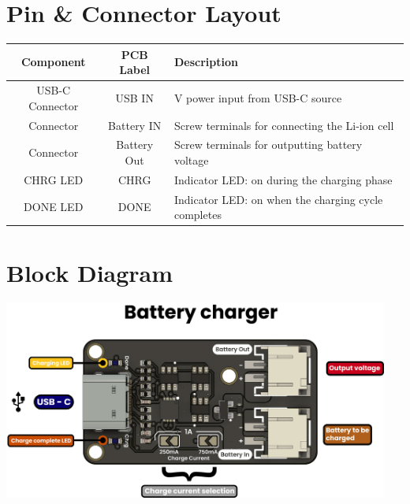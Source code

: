 \documentclass[10pt]{article}
\begin{document}
\section*{Pin \& Connector Layout}
\begin{tabularx}{\textwidth}{|c|c|>{\RaggedRight\arraybackslash}X|}
\hline
\rowcolor{headergray}
Component & PCB Label & Description \\
\hline
USB-C Connector & USB IN & 5 V power input from USB-C source \\
Connector & Battery IN & Screw terminals for connecting the Li-ion cell \\
Connector & Battery Out & Screw terminals for outputting battery voltage \\
CHRG LED & CHRG & Indicator LED: on during the charging phase \\
DONE LED & DONE & Indicator LED: on when the charging cycle completes \\
\hline
\end{tabularx}


\FloatBarrier
\newpage
\vspace*{3em}
\section*{Block Diagram}
\vspace{1em}
\begin{center}
\includegraphics[width=0.95\textwidth,keepaspectratio]{images/function-diagram.jpg}
\end{center}
\newpage
\vspace*{3em}
\end{document}
